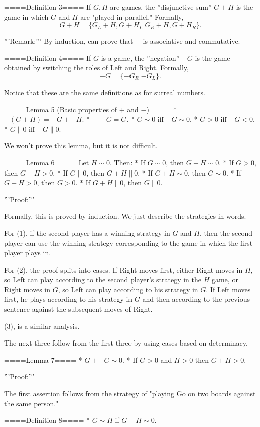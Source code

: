 ====Definition 3====
If $G,H$ are games, the ''disjunctive sum'' $G+H$ is the game in which $G$ and $H$ are "played in parallel." Formally,
$$G+H=\{G_L+H,G+H_L|G_R+H, G+H_R\}.$$

'''Remark:'''
By induction, can prove that $+$ is associative and commutative. 

====Definition 4====
If $G$ is a game, the ''negation'' $-G$ is the game obtained by switching the roles of Left and Right. Formally,
$$-G=\{-G_R|-G_L\}.$$

Notice that these are the same definitions as for surreal numbers.

====Lemma 5 (Basic properties of $+$ and $-$)====
* $-(G+H)=-G+-H$.
* $--G=G$.
* $G\sim 0$ iff $-G\sim 0$.
* $G>0$ iff $-G<0$.
* $G\parallel 0$ iff $-G\parallel 0$.

We won't prove this lemma, but it is not difficult.

====Lemma 6====
Let $H\sim 0$. Then:
* If $G\sim 0$, then $G+H\sim 0$.
* If $G>0$, then $G+H>0$.
* If $G\parallel 0$, then $G+H\parallel 0$.
* If $G+H\sim 0$, then $G\sim 0$.
* If $G+H>0$, then $G>0$.
* If $G+H\parallel 0$, then $G\parallel 0$.

'''Proof:'''

Formally, this is proved by induction. We just describe the strategies in words.

For (1), if the second player has a winning strategy in $G$ and $H$, then the second player can use the winning strategy corresponding to the game in which the first player plays in.

For (2), the proof splits into cases. If Right moves first, either Right moves in $H$, so Left can play according to the second player's strategy in the $H$ game, or Right moves in $G$, so Left can play according to his strategy in $G$. If Left moves first, he plays according to his strategy in $G$ and then according to the previous sentence against the subsequent moves of Right.

(3), is a similar analysis.

The next three follow from the first three by using cases based on determinacy.

====Lemma 7====
* $G+ -G\sim 0$.
* If $G>0$ and $H>0$ then $G+H>0$.

'''Proof:'''

The first assertion follows from the strategy of "playing Go on two boards against the same person."


====Definition 8====
* $G\sim H$ if $G-H\sim 0$.